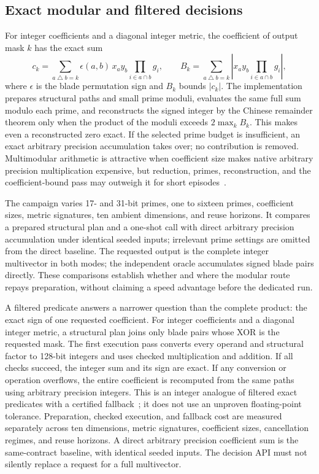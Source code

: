 \documentclass[11pt,a4paper]{article}
\begin{document}
\subsection{Exact modular and filtered decisions}
For integer coefficients and a diagonal integer metric, the coefficient
of output mask $k$ has the exact sum
\begin{equation}
c_k=\sum_{a\mathbin{\triangle}b=k}
  \epsilon(a,b)\,x_a y_b\!
  \prod_{i\in a\cap b}g_i,
\qquad
B_k=\sum_{a\mathbin{\triangle}b=k}
  \left|x_a y_b\prod_{i\in a\cap b}g_i\right|,
\end{equation}
where $\epsilon$ is the blade permutation sign and $B_k$ bounds
$|c_k|$. The implementation prepares structural paths and small prime
moduli, evaluates the same full sum modulo each prime, and reconstructs
the signed integer by the Chinese remainder theorem only when the product
of the moduli exceeds $2\max_k B_k$. This makes even a reconstructed zero
exact. If the selected prime budget is insufficient, an exact arbitrary
precision accumulation takes over; no contribution is removed.
Multimodular arithmetic is attractive when coefficient size makes native
arbitrary precision multiplication expensive, but reduction, primes,
reconstruction, and the coefficient-bound pass may outweigh it for short
episodes~\cite{vanhoe}.

The campaign varies 17- and 31-bit primes, one to sixteen primes,
coefficient sizes, metric signatures, ten ambient dimensions, and reuse
horizons. It compares a prepared structural plan and a one-shot call with
direct arbitrary precision accumulation under identical seeded inputs;
irrelevant prime settings are omitted from the direct baseline. The
requested output is the complete
integer multivector in both modes; the independent oracle accumulates
signed blade pairs directly. These comparisons establish whether and
where the modular route repays preparation, without claiming a speed
advantage before the dedicated run.

A filtered predicate answers a narrower question than the complete
product: the exact sign of one requested coefficient. For integer
coefficients and a diagonal integer metric, a structural plan joins
only blade pairs whose XOR is the requested mask. The first execution
pass converts every operand and structural factor to 128-bit integers
and uses checked multiplication and addition. If all checks succeed,
the integer sum and its sign are exact. If any conversion or operation
overflows, the entire coefficient is recomputed from the same paths
using arbitrary precision integers. This is an integer analogue of
filtered exact predicates with a certified fallback~\cite{cgalfiltered};
it does not use an unproven floating-point tolerance. Preparation,
checked execution, and fallback cost are measured separately across
ten dimensions, metric signatures, coefficient sizes, cancellation
regimes, and reuse horizons. A direct arbitrary precision coefficient
sum is the same-contract baseline, with identical seeded inputs.
The decision API must not silently replace a request for a full
multivector.
\end{document}
